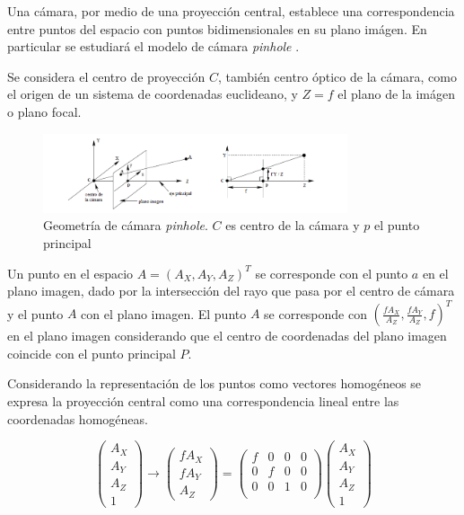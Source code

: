 Una cámara, por medio de una proyección central, establece una correspondencia entre puntos del espacio con puntos bidimensionales en su plano imágen. En particular se estudiará el modelo de cámara \emph{pinhole} \cite{LibroCompGrafica3}.

Se considera el centro de proyección $C$, también centro óptico de la cámara, como el origen de un sistema de coordenadas euclideano, y $Z = f$ el plano de la imágen o plano focal.

\begin{figure}[H]
  \centering
    \includegraphics[width=0.8\textwidth]{./Cap6_reconstruccion/pinhole.png}
  \caption{Geometría de cámara \emph{pinhole}. $C$ es centro de la cámara y $p$ el punto principal}
  \label{fig:Calib-Pinhole}
\end{figure}

Un punto en el espacio $A=(A_X, A_Y, A_Z)^T$ se corresponde con el punto $a$ en el plano imagen, dado por la intersección del rayo que pasa por el centro de cámara y el punto $A$ con el plano imagen. El punto $A$ se corresponde con $(\frac{fA_X}{A_Z}, \frac{fA_Y}{A_Z}, f)^T$ en el plano imagen considerando que el centro de coordenadas del plano imagen coincide con el punto principal $P$.

Considerando la representación de los puntos como vectores homogéneos se expresa la proyección central como una correspondencia lineal entre las coordenadas homogéneas.

\[
\begin{pmatrix}
A_X \\ A_Y \\ A_Z \\ 1
\end{pmatrix}
\to
\begin{pmatrix}
fA_X \\ fA_Y \\ A_Z
\end{pmatrix}
=
\begin{pmatrix}
f & 0 & 0 & 0 \\
0 & f & 0 & 0 \\
0 & 0 & 1 & 0 \\
\end{pmatrix}
\begin{pmatrix}
A_X \\ A_Y \\ A_Z \\ 1
\end{pmatrix}
\]

